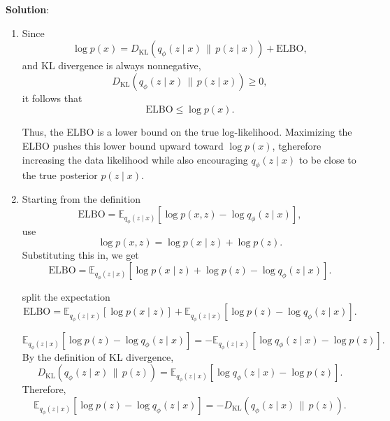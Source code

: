 \documentclass[submit]{harvardml}
\newenvironment{solution}{
    \vspace{2mm}
    \color{blue}\noindent\textbf{Solution}:
}{}
\begin{document}
\begin{solution}
\begin{enumerate}
\begin{enumerate}
\begin{enumerate}
Distribute the minus sign:
\[
D_{\mathrm{KL}}\!\left(q_\phi(z\mid x)\,\|\,p(z\mid x)\right)
=
\mathbb{E}_{q_\phi(z\mid x)}
\left[
\log q_\phi(z\mid x)-\log p(x,z)+\log p(x)
\right].
\]

Since \(\log p(x)\) does not depend on \(z\), it can be taken outside the expectation:
\[
D_{\mathrm{KL}}\!\left(q_\phi(z\mid x)\,\|\,p(z\mid x)\right)
=
\mathbb{E}_{q_\phi(z\mid x)}
\left[
\log q_\phi(z\mid x)-\log p(x,z)
\right]
+\log p(x).
\]

Now rearrange:
\[
\log p(x)
=
D_{\mathrm{KL}}\!\left(q_\phi(z\mid x)\,\|\,p(z\mid x)\right)
+
\mathbb{E}_{q_\phi(z\mid x)}
\left[
\log p(x,z)-\log q_\phi(z\mid x)
\right].
\]

Thus,
\[
\boxed{
\log p(x)
=
D_{\mathrm{KL}}\!\left(q_\phi(z\mid x)\,\|\,p(z\mid x)\right)
+
\mathbb{E}_{q_\phi(z\mid x)}
\left[
\log p(x,z)-\log q_\phi(z\mid x)
\right]
}
\]

                \item Since
\[
\log p(x)
=
D_{\mathrm{KL}}\!\left(q_\phi(z\mid x)\,\|\,p(z\mid x)\right)
+
\mathrm{ELBO},
\]
and KL divergence is always nonnegative,
\[
D_{\mathrm{KL}}\!\left(q_\phi(z\mid x)\,\|\,p(z\mid x)\right)\ge 0,
\]
it follows that
\[
\mathrm{ELBO}\le \log p(x).
\]

Thus, the ELBO is a lower bound on the true log-likelihood. Maximizing the ELBO  pushes this lower bound upward toward \(\log p(x)\), tgherefore increasing the data likelihood while also encouraging \(q_\phi(z\mid x)\) to be close to the true posterior \(p(z\mid x)\).
                \item Starting from the definition
\[
\mathrm{ELBO}
=
\mathbb{E}_{q_\phi(z\mid x)}
\left[
\log p(x,z)-\log q_\phi(z\mid x)
\right],
\]
use 
\[
\log p(x,z)=\log p(x\mid z)+\log p(z).
\]
Substituting this in, we get
\[
\mathrm{ELBO}
=
\mathbb{E}_{q_\phi(z\mid x)}
\left[
\log p(x\mid z)+\log p(z)-\log q_\phi(z\mid x)
\right].
\]

 split the expectation
\[
\mathrm{ELBO}
=
\mathbb{E}_{q_\phi(z\mid x)}[\log p(x\mid z)]
+
\mathbb{E}_{q_\phi(z\mid x)}
\left[
\log p(z)-\log q_\phi(z\mid x)
\right].
\]


\[
\mathbb{E}_{q_\phi(z\mid x)}
\left[
\log p(z)-\log q_\phi(z\mid x)
\right]
=
-
\mathbb{E}_{q_\phi(z\mid x)}
\left[
\log q_\phi(z\mid x)-\log p(z)
\right].
\]
By the definition of KL divergence,
\[
D_{\mathrm{KL}}\!\left(q_\phi(z\mid x)\,\|\,p(z)\right)
=
\mathbb{E}_{q_\phi(z\mid x)}
\left[
\log q_\phi(z\mid x)-\log p(z)
\right].
\]
Therefore,
\[
\mathbb{E}_{q_\phi(z\mid x)}
\left[
\log p(z)-\log q_\phi(z\mid x)
\right]
=
-
D_{\mathrm{KL}}\!\left(q_\phi(z\mid x)\,\|\,p(z)\right).
\]


\end{enumerate}
\end{enumerate}
\end{enumerate}
\end{solution}
\end{document}
